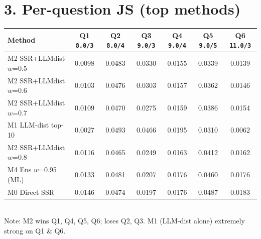 \documentclass[10pt,a4paper]{article}
\begin{document}
\vspace{8pt}
\section*{3. Per-question JS (top methods)}

\centering
\small
\begin{tabular}{@{}lcccccc@{}}
\toprule
Method & Q1 \texttt{8.0/3} & Q2 \texttt{8.0/4} & Q3 \texttt{9.0/3} & Q4 \texttt{9.0/4} & Q5 \texttt{9.0/5} & Q6 \texttt{11.0/3} \\
\midrule
\rowcolor{bestrow} M2 SSR+LLMdist $w$=0.5 & 0.0098 & 0.0483 & 0.0330 & 0.0155 & 0.0339 & 0.0139 \\
M2 SSR+LLMdist $w$=0.6 & 0.0103 & 0.0476 & 0.0303 & 0.0157 & 0.0362 & 0.0146 \\
M2 SSR+LLMdist $w$=0.7 & 0.0109 & 0.0470 & 0.0275 & 0.0159 & 0.0386 & 0.0154 \\
M1 LLM-dist top-10     & 0.0027 & 0.0493 & 0.0466 & 0.0195 & 0.0310 & 0.0062 \\
M2 SSR+LLMdist $w$=0.8 & 0.0116 & 0.0465 & 0.0249 & 0.0163 & 0.0412 & 0.0162 \\
M4 Ens $w$=0.95 (ML)   & 0.0133 & 0.0481 & 0.0207 & 0.0176 & 0.0460 & 0.0176 \\
M0 Direct SSR          & 0.0146 & 0.0474 & 0.0197 & 0.0176 & 0.0487 & 0.0183 \\
\bottomrule
\end{tabular}
\\[2pt]
{\footnotesize Note: M2 wins Q1, Q4, Q5, Q6; loses Q2, Q3. M1 (LLM-dist alone) extremely strong on Q1 \& Q6.}
\flushleft

\vspace{6pt}
\end{document}
